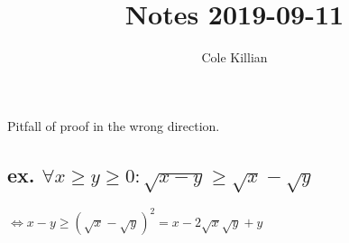 \documentclass{article}
\begin{document}
\title{Notes 2019-09-11}
\author{Cole Killian}

\maketitle

Pitfall of proof in the wrong direction.

\subsection{ex. $\forall x \geq y \geq 0: \sqrt{x - y} \geq \sqrt{x} - \sqrt{y}$}

$\Leftrightarrow x - y \geq (\sqrt{x} - \sqrt{y})^2 = x-2 \sqrt{x} \sqrt{y} + y$
\end{document}
